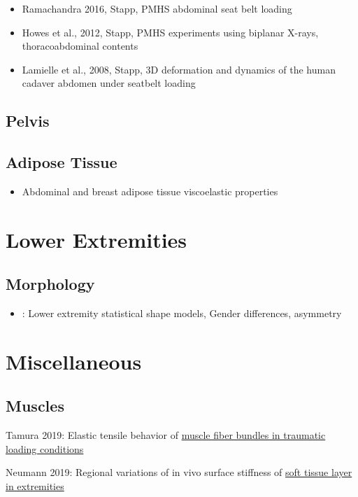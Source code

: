 \documentclass[]{book}
\providecommand{\tightlist}{%
  \setlength{\itemsep}{0pt}\setlength{\parskip}{0pt}}
\begin{document}
\begin{itemize}
\tightlist
\item
  Ramachandra 2016, Stapp, PMHS abdominal seat belt loading
\item
  Howes et al., 2012, Stapp, PMHS experiments using biplanar X-rays, thoracoabdominal contents
\item
  Lamielle et al., 2008, Stapp, 3D deformation and dynamics of the human cadaver abdomen under seatbelt loading
\end{itemize}

\hypertarget{pelvis}{%
\section{Pelvis}\label{pelvis}}

\hypertarget{adipose-tissue}{%
\section{Adipose Tissue}\label{adipose-tissue}}

\begin{itemize}
\tightlist
\item
  Abdominal and breast adipose tissue viscoelastic properties \citep{Calvo-Gallego2019}
\end{itemize}

\hypertarget{lower-extremities}{%
\chapter{Lower Extremities}\label{lower-extremities}}

\hypertarget{morphology}{%
\section{Morphology}\label{morphology}}

\begin{itemize}
\tightlist
\item
  \citet{Audenaert2019}: Lower extremity statistical shape models, Gender differences, asymmetry
\end{itemize}

\hypertarget{miscellaneous}{%
\chapter{Miscellaneous}\label{miscellaneous}}

\hypertarget{muscles}{%
\section{Muscles}\label{muscles}}

Tamura 2019: Elastic tensile behavior of \href{https://www.sciencedirect.com/science/article/pii/S0268003318307083}{muscle fiber bundles in traumatic loading conditions}

Neumann 2019: Regional variations of in vivo surface stiffness of \href{https://www.sciencedirect.com/science/article/pii/S0021929019305135?dgcid=raven_sd_aip_email}{soft tissue layer in extremities}


\end{document}

